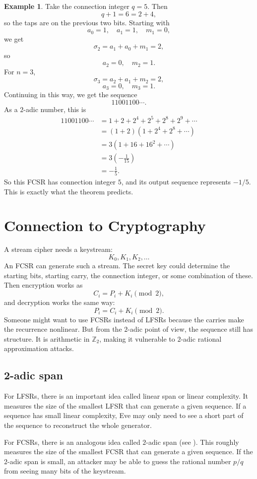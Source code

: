\documentclass[12pt]{amsart}
\theoremstyle{plain}
\theoremstyle{definition}
\newtheorem{example}{Example}[section]
\theoremstyle{remark}
\newcommand{\Z}{\mathbb{Z}}
\begin{document}
\begin{example}
Take the connection integer $q = 5$. Then
$$q + 1 = 6 = 2 + 4,$$
so the taps are on the previous two bits. Starting with
$$a_0 = 1, \quad a_1 = 1, \quad m_1 = 0,$$
we get
$$\sigma_2 = a_1 + a_0 + m_1 = 2,$$
so
$$a_2 = 0, \quad m_2 = 1.$$
For $n = 3$,
$$\sigma_3 = a_2 + a_1 + m_2 = 2,$$
$$a_3 = 0, \quad m_3 = 1.$$
Continuing in this way, we get the sequence
$$11001100 \cdots.$$
As a $2$-adic number, this is
\begin{align*}
11001100\cdots &= 1 + 2 + 2^4 + 2^5 + 2^8 + 2^9 + \cdots \\
&= (1 + 2)(1 + 2^4 + 2^8 + \cdots) \\
&= 3(1 + 16 + 16^2 + \cdots) \\
&=3\left(-\frac{1}{15}\right) \\
&= -\frac{1}{5}.
\end{align*}
So this FCSR has connection integer $5$, and its output sequence represents $-1/5$. This is exactly what the theorem predicts.
\end{example}

\section{Connection to Cryptography}
A stream cipher needs a keystream:
$$K_0, K_1, K_2, \ldots$$
An FCSR can generate such a stream. The secret key could determine the starting bits, starting carry, the connection integer, or some combination of these. Then encryption works as
$$C_i = P_i + K_i \pmod{2},$$
and decryption works the same way:
$$P_i = C_i + K_i \pmod{2}.$$
Someone might want to use FCSRs instead of LFSRs because the carries make the recurrence nonlinear. But from the $2$-adic point of view, the sequence still has structure. It is arithmetic in $\Z_2$, making it vulnerable to $2$-adic rational approximation attacks.

\subsection{2-adic span}
For LFSRs, there is an important idea called linear span or linear complexity. It measures the size of the smallest LFSR that can generate a given sequence. If a sequence has small linear complexity, Eve may only need to see a short part of the sequence to reconstruct the whole generator.

For FCSRs, there is an analogous idea called $2$-adic span (see \cite{KG}). This roughly measures the size of the smallest FCSR that can generate a given sequence. If the $2$-adic span is small, an attacker may be able to guess the rational number $p/q$ from seeing many bits of the keystream.
\end{document}

